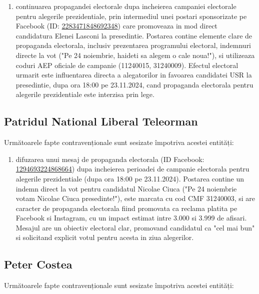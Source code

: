 \documentclass[a4paper,12pt]{article}
\begin{document}
\begin{enumerate}[leftmargin=*, label=\arabic*.)]
    \item continuarea propagandei electorale dupa incheierea campaniei electorale pentru alegerile prezidentiale, prin intermediul unei postari sponsorizate pe Facebook (ID: \href{https://www.facebook.com/ads/library/?id=2283471848692348}{2283471848692348}) care promoveaza in mod direct candidatura Elenei Lasconi la presedintie. Postarea contine elemente clare de propaganda electorala, inclusiv prezentarea programului electoral, indemnuri directe la vot ("Pe 24 noiembrie, haideti sa alegem o cale noua!"), si utilizeaza coduri AEP oficiale de campanie (11240015, 31240009). Efectul electoral urmarit este influentarea directa a alegatorilor in favoarea candidatei USR la presedintie, dupa ora 18:00 pe 23.11.2024, cand propaganda electorala pentru alegerile prezidentiale este interzisa prin lege.
\end{enumerate}

\vspace{0.5cm}

\subsection{Patridul National Liberal Teleorman}
Următoarele fapte contravenționale sunt sesizate împotriva acestei entități:

\begin{enumerate}[leftmargin=*, label=\arabic*.)]
    \item difuzarea unui mesaj de propaganda electorala (ID Facebook: \href{https://www.facebook.com/ads/library/?id=1294693224868664}{1294693224868664}) dupa incheierea perioadei de campanie electorala pentru alegerile prezidentiale (dupa ora 18:00 pe 23.11.2024). Postarea contine un indemn direct la vot pentru candidatul Nicolae Ciuca ("Pe 24 noiembrie votam Nicolae Ciuca presedinte!"), este marcata cu cod CMF 31240003, si are caracter de propaganda electorala fiind promovata ca reclama platita pe Facebook si Instagram, cu un impact estimat intre 3.000 si 3.999 de afisari. Mesajul are un obiectiv electoral clar, promovand candidatul ca "cel mai bun" si solicitand explicit votul pentru acesta in ziua alegerilor.
\end{enumerate}

\vspace{0.5cm}

\subsection{Peter Costea}
Următoarele fapte contravenționale sunt sesizate împotriva acestei entități:
\end{document}
